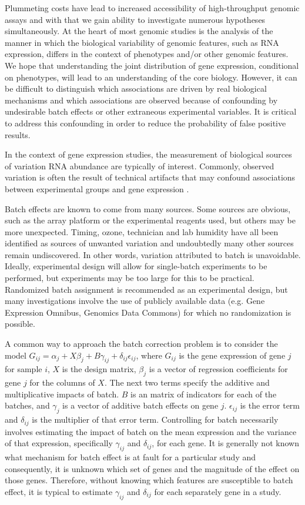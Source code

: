 Plummeting costs have lead to increased accessibility of high-throughput
genomic assays and with that we gain ability to investigate numerous
hypotheses simultaneously. At the heart of most genomic studies is
the analysis of the manner in which the biological variability of
genomic features, such as RNA expression, differs in the context of
phenotypes and/or other genomic features. We hope that understanding
the joint distribution of gene expression, conditional on phenotypes,
will lead to an understanding of the core biology. However, it can
be difficult to distinguish which associations are driven by real
biological mechanisms and which associations are observed because
of confounding by undesirable batch effects or other extraneous experimental
variables. It is critical to address this confounding in order to
reduce the probability of false positive results.

In the context of gene expression studies, the measurement of biological
sources of variation RNA abundance are typically of interest. Commonly,
observed variation is often the result of technical artifacts that
may confound associations between experimental groups and gene expression
\cite{leek2010tackling,lander1999array}. 

Batch effects are known to come from many sources. Some sources are
obvious, such as the array platform or the experimental reagents used,
but others may be more unexpected. Timing, ozone\cite{fare2003effects},
technician and lab humidity have all been identified as sources of
unwanted variation and undoubtedly many other sources remain undiscovered\cite{scherer2009batch}.
In other words, variation attributed to batch is unavoidable. Ideally,
experimental design will allow for single-batch experiments to be
performed, but experiments may be too large for this to be practical.
Randomized batch assignment is recommended as an experimental design\cite{conesa2016survey},
but many investigations involve the use of publicly available data
(e.g. Gene Expression Omnibus, Genomics Data Commons) for which no
randomization is possible.

A common way to approach the batch correction problem is to consider
the model $G_{ij}=\alpha_{j}+X\beta_{j}+B\gamma_{ij}+\delta_{ij}\epsilon_{ij}$,
where $G_{ij}$ is the gene expression of gene $j$ for sample $i$,
$X$ is the design matrix, $\beta_{j}$ is a vector of regression
coefficients for gene $j$ for the columns of $X$. The next two terms
specify the additive and multiplicative impacts of batch. \textbf{$B$}
is an matrix of indicators for each of the batches, and $\gamma_{j}$
is a vector of additive batch effects on gene $j$. $\epsilon_{ij}$
is the error term and $\delta_{ij}$ is the multiplier of that error
term. Controlling for batch necessarily involves estimating the impact
of batch on the mean expression and the variance of that expression,
specifically $\gamma_{ij}$ and $\delta_{ij}$, for each gene. It
is generally not known what mechanism for batch effect is at fault
for a particular study and consequently, it is unknown which set of
genes and the magnitude of the effect on those genes. Therefore, without
knowing which features are susceptible to batch effect, it is typical
to estimate $\gamma_{ij}$ and $\delta_{ij}$ for each separately
gene in a study. 

